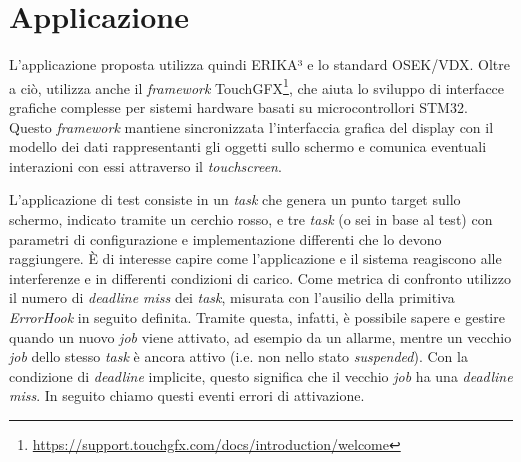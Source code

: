 \documentclass{article}
\begin{document}
\section{Applicazione}
L'applicazione proposta utilizza quindi ERIKA³ e lo standard OSEK/VDX. Oltre a ciò, utilizza anche il \textit{framework} TouchGFX\footnote{\url{https://support.touchgfx.com/docs/introduction/welcome}}, che aiuta lo sviluppo di interfacce grafiche complesse per sistemi hardware basati su microcontrollori STM32. Questo \textit{framework} mantiene sincronizzata l'interfaccia grafica del display con il modello dei dati rappresentanti gli oggetti sullo schermo e comunica eventuali interazioni con essi attraverso il \textit{touchscreen}.

L'applicazione di test consiste in un \textit{task} che genera un punto target sullo schermo, indicato tramite un cerchio rosso, e tre \textit{task} (o sei in base al test) con parametri di configurazione e implementazione differenti che lo devono raggiungere.
È di interesse capire come l'applicazione e il sistema reagiscono alle interferenze e in differenti condizioni di carico. 
Come metrica di confronto utilizzo il numero di \textit{deadline miss} dei \textit{task}, misurata con l'ausilio della primitiva \textit{ErrorHook} in seguito definita. Tramite questa, infatti, è possibile sapere e gestire quando un nuovo \textit{job} viene attivato, ad esempio da un allarme, mentre un vecchio \textit{job} dello stesso \textit{task} è ancora attivo (i.e. non nello stato \textit{suspended}). Con la condizione di \textit{deadline} implicite, questo significa che il vecchio \textit{job} ha una \textit{deadline miss}. In seguito chiamo questi eventi errori di attivazione.
\end{document}

